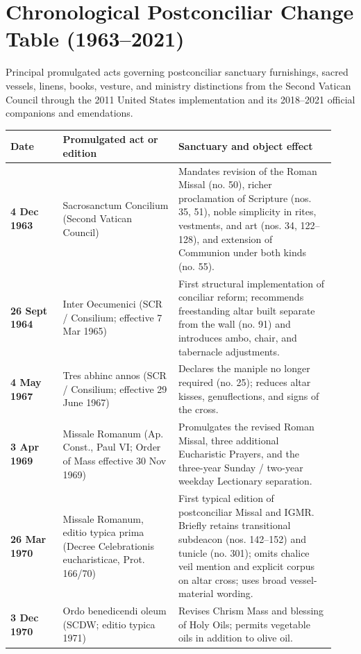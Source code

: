 \clearpage
\section{Chronological Postconciliar Change Table (1963--2021)}
Principal promulgated acts governing postconciliar sanctuary furnishings, sacred vessels, linens, books, vesture, and ministry distinctions from the Second Vatican Council through the 2011 United States implementation and its 2018--2021 official companions and emendations.

{\footnotesize\begin{longtable}{>{\raggedright\arraybackslash}p{0.15\linewidth}>{\raggedright\arraybackslash}p{0.33\linewidth}>{\raggedright\arraybackslash}p{0.45\linewidth}}
\toprule
\textbf{Date} & \textbf{Promulgated act or edition} & \textbf{Sanctuary and object effect} \\
\midrule
\endhead
\textbf{4 Dec 1963} & Sacrosanctum Concilium (Second Vatican Council) & Mandates revision of the Roman Missal (no. 50), richer proclamation of Scripture (nos. 35, 51), noble simplicity in rites, vestments, and art (nos. 34, 122--128), and extension of Communion under both kinds (no. 55). \\
\textbf{26 Sept 1964} & Inter Oecumenici (SCR / Consilium; effective 7 Mar 1965) & First structural implementation of conciliar reform; recommends freestanding altar built separate from the wall (no. 91) and introduces ambo, chair, and tabernacle adjustments. \\
\textbf{4 May 1967} & Tres abhinc annos (SCR / Consilium; effective 29 June 1967) & Declares the maniple no longer required (no. 25); reduces altar kisses, genuflections, and signs of the cross. \\
\textbf{3 Apr 1969} & Missale Romanum (Ap. Const., Paul VI; Order of Mass effective 30 Nov 1969) & Promulgates the revised Roman Missal, three additional Eucharistic Prayers, and the three-year Sunday / two-year weekday Lectionary separation. \\
\textbf{26 Mar 1970} & Missale Romanum, editio typica prima (Decree Celebrationis eucharisticae, Prot. 166/70) & First typical edition of postconciliar Missal and IGMR. Briefly retains transitional subdeacon (nos. 142--152) and tunicle (no. 301); omits chalice veil mention and explicit corpus on altar cross; uses broad vessel-material wording. \\
\textbf{3 Dec 1970} & Ordo benedicendi oleum (SCDW; editio typica 1971) & Revises Chrism Mass and blessing of Holy Oils; permits vegetable oils in addition to olive oil. \\

\end{longtable}}
